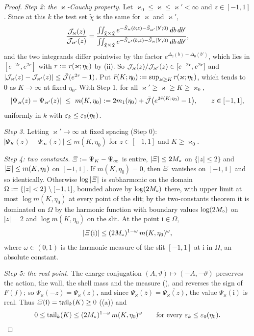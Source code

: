 \begin{proof}
\emph{Step 2: the $\varkappa$-Cauchy property.} Let $\varkappa_0\le\varkappa\le\varkappa'<\infty$ and $z\in[-1,1]$. Since at this $k$ the test set $\tilde\chi$ is the same for $\varkappa$ and $\varkappa'$,
\[
\frac{\mathcal J_\varkappa(z)}{\mathcal J_{\varkappa'}(z)}=\frac{\iint_{\tilde\chi\times\tilde\chi}e^{-\tilde S_\varkappa(b;z)-\tilde S_{\varkappa'}(b';0)}\,db\,db'}
{\iint_{\tilde\chi\times\tilde\chi}e^{-\tilde S_{\varkappa'}(b;z)-\tilde S_\varkappa(b';0)}\,db\,db'},
\]
and the two integrands differ pointwise by the factor $e^{\Delta_z(b)-\Delta_0(b')}$, which lies in $[e^{-2r},e^{2r}]$ with $r:= r(\varkappa;\eta_0)$ by \HS(ii). So $\mathcal J_\varkappa(z)/\mathcal J_{\varkappa'}(z)\in[e^{-2r},e^{2r}]$ and $|\mathcal J_\varkappa(z)-\mathcal J_{\varkappa'}(z)|\le\bar{\mathcal J}(e^{2r}-1)$. Put $\bar r(K;\eta_0):=\sup_{\varkappa\ge K}r(\varkappa;\eta_0)$, which tends to $0$ as $K\to\infty$ at fixed $\eta_0$. With Step 1, for all $\varkappa'\ge\varkappa\ge K\ge\varkappa_0$,
\[
|\Psi_\varkappa(z)-\Psi_{\varkappa'}(z)|\ \le\ m(K,\eta_0)\defeq2m_1(\eta_0)+\bar{\cJ}\big(e^{2\bar r(K;\eta_0)}-1\big),\qquad z\in[-1,1],
\]
uniformly in $k$ with $\varepsilon_k\le\varepsilon_0(\eta_0)$.

\emph{Step 3.} Letting $\varkappa'\to\infty$ at fixed spacing (Step 0): $|\Psi_K(z)-\Psi_\infty(z)|\le m(K,\eta_0)$ for $z\in[-1,1]$ and $K\ge\varkappa_0$.

\emph{Step 4: two constants.} $\varXi:=\Psi_K-\Psi_\infty$ is entire, $|\varXi|\le2M_\circ$ on $\{|z|\le2\}$ and $|\varXi|\le m(K,\eta_0)$ on $[-1,1]$. If $m(K,\eta_0)=0$, then $\varXi$ vanishes on $[-1,1]$ and so identically. Otherwise $\log|\varXi|$ is subharmonic on the domain $\Omega:=\{|z|<2\}\setminus[-1,1]$, bounded above by $\log(2M_\circ)$ there, with upper limit at most $\log m(K,\eta_0)$ at every point of the slit; by the two-constants theorem \cite[\S4.3]{Ran95} it is dominated on $\Omega$ by the harmonic function with boundary values $\log(2M_\circ)$ on $|z|=2$ and $\log m(K,\eta_0)$ on the slit. At the point $\mathrm i\in\Omega$,
\[
|\varXi(\mathrm i)|\le(2M_\circ)^{1-\omega}\,m(K,\eta_0)^{\omega},
\]
where $\omega\in(0,1)$ is the harmonic measure of the slit $[-1,1]$ at $\mathrm i$ in $\Omega$, an absolute constant.

\emph{Step 5: the real point.} The charge conjugation $(A,\vartheta)\mapsto(-A,-\vartheta)$ preserves the action, the wall, the shell mass and the measure (), and reverses the sign of $F(f)$; so $\Psi_\varkappa(-z)=\Psi_\varkappa(z)$, and since $\Psi_\varkappa(\bar z)=\overline{\Psi_\varkappa(z)}$, the value $\Psi_\varkappa(\mathrm i)$ is real. Thus $\varXi(\mathrm i)=\operatorname{tail}_k(K)\ge0$ ((a)) and
\[
0\le\operatorname{tail}_k(K)\le(2M_\circ)^{1-\omega}\,m(K,\eta_0)^{\omega}\qquad\text{for every }\varepsilon_k\le\varepsilon_0(\eta_0).
\]


\end{proof}
